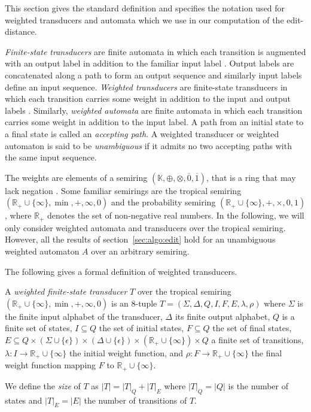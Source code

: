 \documentclass{llncs}
\def\Kset{\mathbb{K}}
\def\Rset{\mathbb{R}}
\def\Tset{\Rset_+ \cup \{\infty\}}
\newcommand{\set}[1]{\{#1\}}
\newcommand{\0}{\overline{0}}
\newcommand{\1}{\overline{1}}
\newcommand{\+}{\oplus}
\renewcommand{\.}{\otimes}
\newcommand{\K}{(\Kset, \+, \., \0, \1)}
\newcommand{\T}{(\Rset_+ \cup \set{\infty}, \min, +, \infty, 0)}
\newcommand{\R}{(\Rset_+ \cup \set{\infty}, +, \times, 0, 1)}
\newcommand{\Trans}{T = (\Sigma, \Delta, Q, I, F, E, \lambda, \rho)}
\begin{document}
This section gives the standard definition and specifies the notation
used for weighted transducers and automata which we use in our
computation of the edit-distance.

\emph{Finite-state transducers} are finite automata \cite{perrin} in
which each transition is augmented with an output label in addition to
the familiar input label \cite{berstel,eilenberg}. Output labels are
concatenated along a path to form an output sequence and similarly
input labels define an input sequence. \emph{Weighted transducers} are
finite-state transducers in which each transition carries some weight
in addition to the input and output labels
\cite{soittola,kuich}. Similarly, \emph{weighted automata} are finite
automata in which each transition carries some weight in addition to
the input label. A path from an initial state to a final state is
called an \emph{accepting path}. A weighted transducer or weighted
automaton is said to be \emph{unambiguous} if it admits no two
accepting paths with the same input sequence.

The weights are elements of a semiring $\K$, that is a ring that may
lack negation \cite{kuich}. Some familiar semirings are the tropical
semiring $\T$ and the probability semiring $\R$, where $\Rset_+$
denotes the set of non-negative real numbers. In the following, we
will only consider weighted automata and transducers over the tropical
semiring. However, all the results of section~\ref{sec:algo:edit} hold
for an unambiguous weighted automaton $A$ over an arbitrary semiring.

The following gives a formal definition of weighted transducers.

\begin{definition}
  A {\em weighted finite-state transducer} $T$ over the tropical
  semiring $\T$ is an 8-tuple $\Trans$ where $\Sigma$ is the finite
  input alphabet of the transducer, $\Delta$ its finite output
  alphabet, $Q$ is a finite set of states, $I \subseteq Q$ the set of
  initial states, $F \subseteq Q$ the set of final states, $E
  \subseteq Q \times (\Sigma \cup \set{\epsilon}) \times (\Delta \cup
  \set{\epsilon}) \times (\Tset) \times Q$ a finite set of
  transitions, $\lambda: I \rightarrow \Tset$ the initial weight
  function, and $\rho: F \rightarrow \Tset$ the final weight function
  mapping $F$ to $\Tset$.

\end{definition}
We define the {\em size} of $T$ as $|T| = |T|_Q + |T|_E$ where $|T|_Q
= |Q|$ is the number of states and $|T|_E = |E|$ the number of
transitions of $T$.
\end{document}
